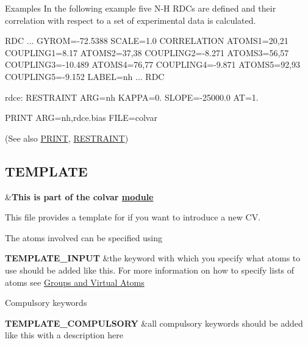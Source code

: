 \begin{DoxyParagraph}{Examples}
In the following example five N-\/\+H R\+D\+Cs are defined and their correlation with respect to a set of experimental data is calculated.
\end{DoxyParagraph}
\begin{DoxyVerb}RDC ...
GYROM=-72.5388
SCALE=1.0 
CORRELATION
ATOMS1=20,21 COUPLING1=8.17
ATOMS2=37,38 COUPLING2=-8.271
ATOMS3=56,57 COUPLING3=-10.489
ATOMS4=76,77 COUPLING4=-9.871
ATOMS5=92,93 COUPLING5=-9.152
LABEL=nh
... RDC 

rdce: RESTRAINT ARG=nh KAPPA=0. SLOPE=-25000.0 AT=1.

PRINT ARG=nh,rdce.bias FILE=colvar
\end{DoxyVerb}
 (See also \hyperlink{PRINT}{P\+R\+I\+N\+T}, \hyperlink{RESTRAINT}{R\+E\+S\+T\+R\+A\+I\+N\+T}) \hypertarget{TEMPLATE}{}\subsection{T\+E\+M\+P\+L\+A\+T\+E}\label{TEMPLATE}
\begin{TabularC}{2}
\hline
&{\bfseries  This is part of the colvar \hyperlink{mymodules}{module }}   \\
\end{TabularC}
This file provides a template for if you want to introduce a new C\+V.

\begin{DoxyParagraph}{The atoms involved can be specified using}

\end{DoxyParagraph}
\begin{TabularC}{2}
\hline
{\bfseries  T\+E\+M\+P\+L\+A\+T\+E\+\_\+\+I\+N\+P\+U\+T } &the keyword with which you specify what atoms to use should be added like this. For more information on how to specify lists of atoms see \hyperlink{Group}{Groups and Virtual Atoms}   \\
\end{TabularC}


\begin{DoxyParagraph}{Compulsory keywords}

\end{DoxyParagraph}
\begin{TabularC}{2}
\hline
{\bfseries  T\+E\+M\+P\+L\+A\+T\+E\+\_\+\+C\+O\+M\+P\+U\+L\+S\+O\+R\+Y } &all compulsory keywords should be added like this with a description here   \\
\end{TabularC}


